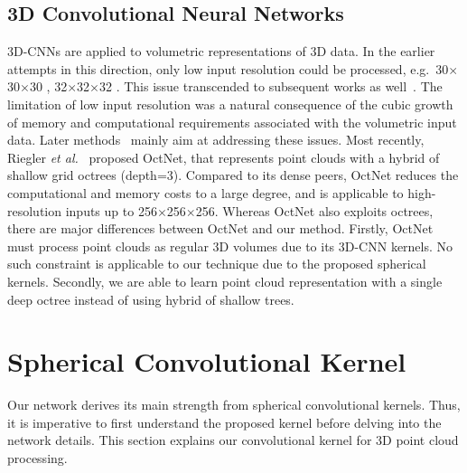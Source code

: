 \documentclass[10pt,twocolumn,letterpaper]{article}
\begin{document}
\subsection{3D Convolutional Neural Networks} 
\vspace{-2mm}
3D-CNNs are  applied to volumetric representations of 3D data. 
 In the earlier attempts in this direction, only low input resolution  could be processed, e.g.~30$\times$30$\times$30 \cite{wu20153d}, 32$\times$32$\times$32 \cite{maturana2015voxnet}.
This issue transcended to subsequent works as well~\cite{huang2016point,sedaghat2016orientation,zeng20163dmatch,zhang2017deepcontext}. 
The limitation of low input resolution was a natural consequence of the cubic growth of memory and computational requirements associated with the volumetric input data. 
Later methods~\cite{EngelckeICRA2017,li2016fpnn} mainly aim at addressing these issues. 
Most recently, 
Riegler \emph{et al.}~\cite{riegler2017octnet} proposed OctNet, that represents point clouds with a hybrid of shallow grid octrees (depth=3). Compared to its dense peers, OctNet reduces the computational and memory costs to a large degree, and is applicable to high-resolution inputs up to 256$\times$256$\times$256. 
Whereas OctNet also exploits octrees, there are major differences between OctNet and our method. 
Firstly, OctNet must process point clouds as regular 3D volumes due to its 3D-CNN kernels. No such constraint is applicable to our technique due to the proposed  spherical kernels. Secondly, we are able to learn point cloud representation with a single deep octree instead of using hybrid of shallow trees. 


\section{Spherical Convolutional Kernel} \label{sec:SC}
\vspace{-1mm}
Our network derives its main strength from spherical convolutional kernels. Thus, it is imperative to first understand the proposed kernel before delving into the network details. This section explains our convolutional kernel for 3D point cloud processing.     
\end{document}
